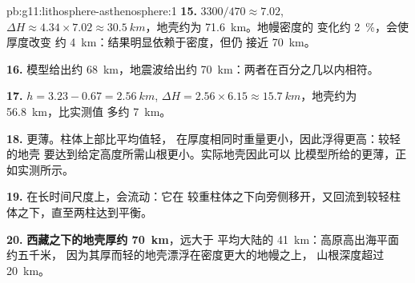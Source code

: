\begin{solution}{pb:g11:lithosphere-asthenosphere:1}
\textbf{15.} $3300/470 \approx 7.02$, $\Delta H \approx 4.34 \times 7.02
\approx \qty{30.5}{km}$，地壳约为 \qty{71.6}{km}。地幔密度的
变化约 \qty{2}{\percent}，会使厚度改变
约 \qty{4}{km}：结果明显依赖于密度，但仍
接近 \qty{70}{km}。

\textbf{16.} 模型给出约 \qty{68}{km}，地震波给出约
\qty{70}{km}：两者在百分之几以内相符。

\textbf{17.} $h = 3.23 - 0.67 = \qty{2.56}{km}$, $\Delta H = 2.56 \times
6.15 \approx \qty{15.7}{km}$，地壳约为 \qty{56.8}{km}，比实测值
多约 \qty{7}{km}。

\textbf{18.} 更薄。柱体上部比平均值轻，
在厚度相同时重量更小，因此浮得更高：较轻的地壳
要达到给定高度所需山根更小。实际地壳因此可以
比模型所给的更薄，正如实测所示。

\textbf{19.} 在长时间尺度上，会流动：它在
较重柱体之下向旁侧移开，又回流到较轻柱体之下，直至两柱达到平衡。

\textbf{20.} \textbf{西藏之下的地壳厚约 \qty{70}{km}}，远大于
平均大陆的 \qty{41}{km}：高原高出海平面约五千米，
因为其厚而轻的地壳漂浮在密度更大的地幔之上，
山根深度超过 \qty{20}{km}。
\end{solution}

